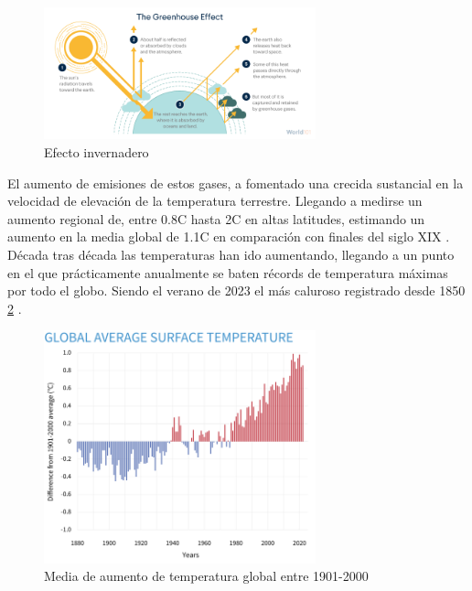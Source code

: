 \begin{figure} [H]
	\centering
	\includegraphics[width=0.7\textwidth]{fig/climate-change_greenhouse-effect_steps.png}
	\caption[Efecto invernadero]{Efecto invernadero \footnotemark}
	\label{fig:ej17}
\end{figure}

El aumento de emisiones de estos gases, a fomentado una crecida sustancial en la velocidad de elevación de la temperatura terrestre. Llegando a medirse un aumento regional de, entre 0.8\textdegree C hasta 2\textdegree C en altas latitudes, estimando un aumento en la media global de 1.1\textdegree C en comparación con finales del siglo XIX \cite{ruddiman2003anthropogenic}.\newline
\newline
Década tras década las temperaturas han ido aumentando, llegando a un punto en el que prácticamente anualmente se baten récords de temperatura máximas por todo el globo. Siendo el verano de 2023 el más caluroso registrado desde 1850 \ref{fig:ej18} \cite{NCEIWeb}.

\begin{figure} [H]
	\centering
	\includegraphics[width=0.7\textwidth]{fig/ClimateDashboard-global-surface-temperature-graph-20230118-1400px.png}
	\caption[Media de aumento de temperatura global entre 1901-2000]{Media de aumento de temperatura global entre 1901-2000 \footnotemark}
	\label{fig:ej18}
\end{figure}

